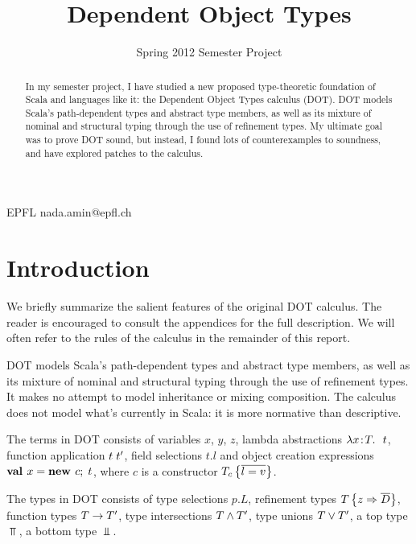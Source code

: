 \documentclass[preprint]{sigplanconf}
\begin{document}
\copyrightdata{[to be supplied]}


\title{Dependent Object Types}
\subtitle{Spring 2012 Semester Project}

           {EPFL}
           {nada.amin@epfl.ch}

\maketitle

\begin{abstract}
In my semester project, I have studied a new proposed type-theoretic
foundation of Scala and languages like it: the Dependent Object Types
calculus (DOT). DOT models Scala's path-dependent types and abstract
type members, as well as its mixture of nominal and structural typing
through the use of refinement types. My ultimate goal was to prove DOT
sound, but instead, I found lots of counterexamples to soundness, and
have explored patches to the calculus.
\end{abstract}


\section{Introduction}

We briefly summarize the salient features of the original DOT
calculus. The reader is encouraged to consult the appendices for the
full description. We will often refer to the rules of the calculus
in the remainder of this report.

DOT models Scala's path-dependent types and abstract type members, as
well as its mixture of nominal and structural typing through the use
of refinement types. It makes no attempt to model inheritance or
mixing composition. The calculus does not model what's currently in
Scala: it is more normative than descriptive.

The terms in DOT consists of variables $x$, $y$, $z$, lambda
abstractions $\lambda x\!:\!T.\ \ t$, function application $t\;t'$, field
selections $t.l$ and object creation expressions $\textbf{val }x = \textbf{new }c ;\; t$, where
$c$ is a constructor $T_c \left\{\overline{l = v}\right\}$.

The types in DOT consists of type selections $p.L$, refinement types
$T \left\{z \Rightarrow \overline{D} \right\}$, function types $T \rightarrow T'$, type intersections
$T \wedge T'$, type unions $T \vee T'$, a top type $\Top$, a bottom
type $\Bot$.
\end{document}
